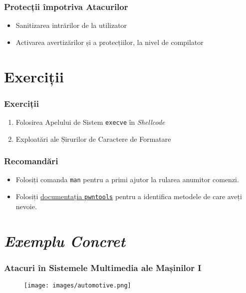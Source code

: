 \documentclass[xcolor={table}]{beamer}
\begin{document}
	\begin{frame}
		\frametitle{Protecții împotriva Atacurilor}\pause
		\begin{itemize}[<+->]
			\item Sanitizarea intrărilor de la utilizator
			\item Activarea avertizărilor și a protecțiilor, la nivel de compilator
		\end{itemize}
	\end{frame}

	\section{Exerciții}

	\begin{frame}
		\frametitle{Exerciții}\pause
		\begin{enumerate}[<+->]
		    \item Folosirea Apelului de Sistem \texttt{execve} în \textit{Shellcode}
		    \item Exploatări ale Șirurilor de Caractere de Formatare
	    \end{enumerate}
	\end{frame}

	\begin{frame}
		\frametitle{Recomandări}\pause
		\begin{itemize}[<+->]
		    \item Folosiți comanda \texttt{man} pentru a primi ajutor la rularea anumitor comenzi.
		    \item Folosiți \href{https://docs.pwntools.com/en/stable/}{documentația \texttt{pwntools}} pentru a identifica metodele de care aveți nevoie.
	    \end{itemize}
	\end{frame}

	\section{\textit{Exemplu Concret}}

	\begin{frame}
		\frametitle{Atacuri în Sistemele Multimedia ale Mașinilor I}\pause
		\begin{figure}
            \centering
            \texttt{[image: images/automotive.png]}
        \end{figure}
    \end{frame}
\end{document}
